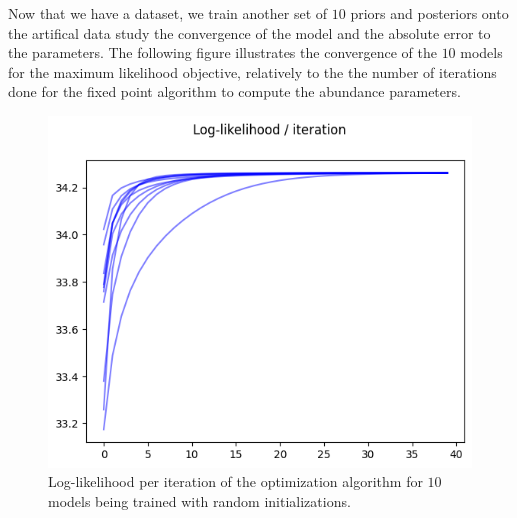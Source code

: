 Now that we have a dataset, we train another set of $10$ priors and posteriors onto the artifical data study the convergence of the model
and the absolute error to the parameters.
The following figure illustrates the convergence of the $10$ models for the maximum likelihood objective, relatively to the the number
of iterations done for the fixed point algorithm to compute the abundance parameters.
\begin{figure}[H]
    \centering
    \includegraphics[scale=0.7]{images/markovian_tree_model_loglikelihood_multiple_convergences}
    \caption{Log-likelihood per iteration of the optimization algorithm for $10$ models being trained with random initializations.}
    \label{fig:markovian_tree_model_loglikelihood_convergence}
\end{figure}

